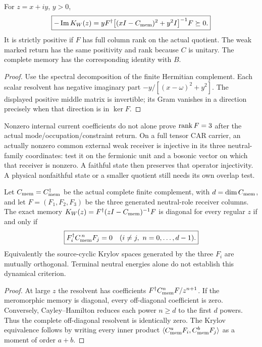 \documentclass[12pt,a4paper]{article}
\begin{document}
\begin{corollary}
\label{p5c:cor:v2168-positive-weak-return}
For $z=x+iy$, $y>0$,
\[
 \boxed{-\operatorname{Im}K_W(z)
 =yF^\dagger\bigl[(xI-C_{\rm mem})^2+y^2I\bigr]^{-1}F\succeq0.}
\]
It is strictly positive if $F$ has full column rank on the actual quotient.
The weak marked return has the same positivity and rank because $C$ is
unitary. The complete memory has the corresponding identity with $B$.
\end{corollary}
\begin{proof}
Use the spectral decomposition of the finite Hermitian complement. Each
scalar resolvent has negative imaginary part
$-y/[(x-\omega)^2+y^2]$. The displayed positive middle matrix is invertible;
its Gram vanishes in a direction precisely when that direction is in
$\ker F$.
\end{proof}
Nonzero internal current coefficients do not alone prove $\operatorname{rank} F=3$ after
the actual mode/occupation/constraint return. On a full tensor CAR carrier,
an actually nonzero common external weak receiver is injective in its
three neutral-family coordinates: test it on the fermionic unit and a
bosonic vector on which that receiver is nonzero. A faithful state then
preserves that operator injectivity. A physical nonfaithful state or a
smaller quotient still needs its own overlap test.


\begin{theorem}
\label{p5c:thm:v240-memory-krylov-diagonality}
Let $C_{\rm mem}=C_{\rm mem}^\dagger$ be the actual complete finite
complement, with $d=\dim C_{\rm mem}$, and let
$F=(F_1,F_2,F_3)$ be the three generated neutral-role receiver
columns. The exact memory
$K_W(z)=F^\dagger(zI-C_{\rm mem})^{-1}F$ is diagonal for every
regular $z$ if and only if
\begin{equation}\label{p5c:eq:v240-krylov-moment-test}
 \boxed{F_i^\dagger C_{\rm mem}^{\,n}F_j=0
           \quad(i\ne j,\ n=0,\ldots,d-1).}
\end{equation}
Equivalently the source-cyclic Krylov spaces generated by the three
$F_i$ are mutually orthogonal. Terminal neutral energies alone do
not establish this dynamical criterion.
\end{theorem}
\begin{proof}
At large $z$ the resolvent has coefficients
$F^\dagger C_{\rm mem}^nF/z^{n+1}$. If the meromorphic memory
is diagonal, every off-diagonal coefficient is zero. Conversely,
Cayley--Hamilton reduces each power $n\ge d$ to the first $d$
powers. Thus the complete off-diagonal resolvent is identically
zero. The Krylov equivalence follows by writing every inner product
$\langle C_{\rm mem}^aF_i,C_{\rm mem}^bF_j\rangle$
as a moment of order $a+b$.
\end{proof}
\end{document}
